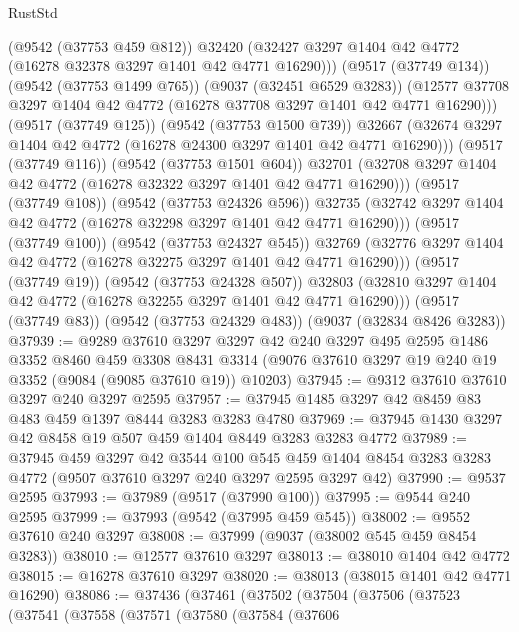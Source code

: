 \begin{lexlean}{RustStd}
\begin{coremodule}
                  (@9542 (@37753 @459 @812))
                  @32420
                  (@32427 @3297 @1404 @42 @4772 (@16278 @32378 @3297 @1401 @42 @4771 @16290)))
                (@9517 (@37749 @134))
                (@9542 (@37753 @1499 @765))
                (@9037 (@32451 @6529 @3283))
                (@12577 @37708 @3297 @1404 @42 @4772 (@16278 @37708 @3297 @1401 @42 @4771 @16290)))
              (@9517 (@37749 @125))
              (@9542 (@37753 @1500 @739))
              @32667
              (@32674 @3297 @1404 @42 @4772 (@16278 @24300 @3297 @1401 @42 @4771 @16290)))
            (@9517 (@37749 @116))
            (@9542 (@37753 @1501 @604))
            @32701
            (@32708 @3297 @1404 @42 @4772 (@16278 @32322 @3297 @1401 @42 @4771 @16290)))
          (@9517 (@37749 @108))
          (@9542 (@37753 @24326 @596))
          @32735
          (@32742 @3297 @1404 @42 @4772 (@16278 @32298 @3297 @1401 @42 @4771 @16290)))
        (@9517 (@37749 @100))
        (@9542 (@37753 @24327 @545))
        @32769
        (@32776 @3297 @1404 @42 @4772 (@16278 @32275 @3297 @1401 @42 @4771 @16290)))
      (@9517 (@37749 @19))
      (@9542 (@37753 @24328 @507))
      @32803
      (@32810 @3297 @1404 @42 @4772 (@16278 @32255 @3297 @1401 @42 @4771 @16290)))
    (@9517 (@37749 @83))
    (@9542 (@37753 @24329 @483))
    (@9037 (@32834 @8426 @3283))
@37939 := @9289
    @37610
    @3297
    @3297
    @42
    @240
    @3297
    @495
    @2595
    @1486
    @3352
    @8460
    @459
    @3308
    @8431
    @3314
    (@9076 @37610 @3297 @19 @240 @19 @3352 (@9084 (@9085 @37610 @19)) @10203)
@37945 := @9312 @37610 @37610 @3297 @240 @3297 @2595
@37957 := @37945 @1485 @3297 @42 @8459 @83 @483 @459 @1397 @8444 @3283 @3283 @4780
@37969 := @37945 @1430 @3297 @42 @8458 @19 @507 @459 @1404 @8449 @3283 @3283 @4772
@37989 := @37945
    @459
    @3297
    @42
    @3544
    @100
    @545
    @459
    @1404
    @8454
    @3283
    @3283
    @4772
    (@9507 @37610 @3297 @240 @3297 @2595 @3297 @42)
@37990 := @9537 @2595
@37993 := @37989 (@9517 (@37990 @100))
@37995 := @9544 @240 @2595
@37999 := @37993 (@9542 (@37995 @459 @545))
@38002 := @9552 @37610 @240 @3297
@38008 := @37999 (@9037 (@38002 @545 @459 @8454 @3283))
@38010 := @12577 @37610 @3297
@38013 := @38010 @1404 @42 @4772
@38015 := @16278 @37610 @3297
@38020 := @38013 (@38015 @1401 @42 @4771 @16290)
@38086 := @37436
    (@37461
      (@37502
        (@37504
          (@37506
            (@37523
              (@37541
                (@37558
                  (@37571
                    (@37580
                      (@37584
                        (@37606

\end{coremodule}
\end{lexlean}
